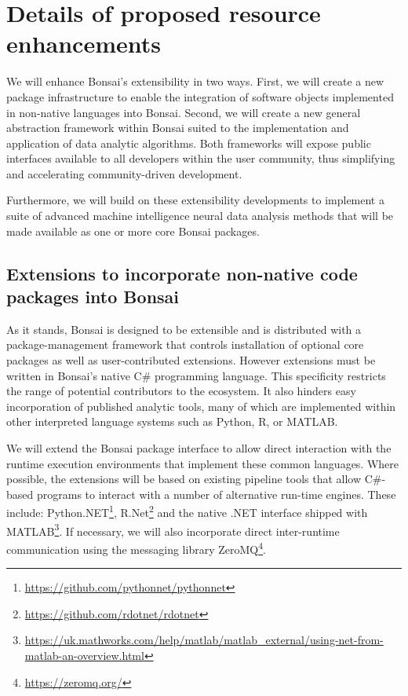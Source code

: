 

\section{Details of proposed resource enhancements}

We will enhance Bonsai's extensibility in two ways.
%
First, we will create a new package infrastructure to enable the integration of software objects implemented in non-native languages into Bonsai.
%
Second, we will create a new general abstraction framework within Bonsai suited to the implementation and application of data analytic algorithms.
%
Both frameworks will expose public interfaces available to all developers within the user community, thus simplifying and accelerating community-driven development.

Furthermore, we will build on these extensibility developments to implement a suite of advanced machine intelligence neural data analysis methods that will be made available as one or more core Bonsai packages.

\subsection{Extensions to incorporate non-native code packages into Bonsai}

As it stands, Bonsai is designed to be extensible and is distributed with a package-management framework that controls installation of optional core packages as well as user-contributed extensions.
%
However extensions must be written in Bonsai's native C\# programming language.
%
This specificity restricts the range of potential contributors to the ecosystem.
%
It also hinders easy incorporation of published analytic tools, many of which are implemented within other interpreted language systems such as Python, R, or MATLAB.  

We will extend the Bonsai package interface to allow direct interaction with the runtime execution environments that implement these common languages.  
%
Where possible, the extensions will be based on existing pipeline tools that allow C\#-based programs to interact with a number of alternative run-time engines.
%
These include:
%
Python.NET\footnote{\url{https://github.com/pythonnet/pythonnet}},
%
R.Net\footnote{\url{https://github.com/rdotnet/rdotnet}}
%
and the native .NET interface shipped with MATLAB\footnote{\url{https://uk.mathworks.com/help/matlab/matlab\_external/using-net-from-matlab-an-overview.html}}.
%
If necessary, we will also incorporate direct inter-runtime communication using the messaging library ZeroMQ\footnote{\url{https://zeromq.org/}}.


